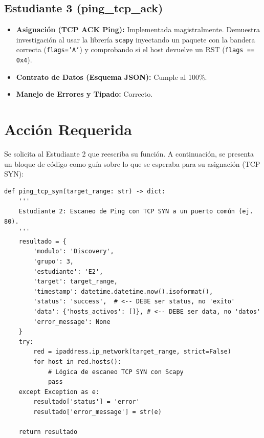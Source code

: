 \documentclass[12pt,a4paper]{article}
\begin{document}
\subsection*{\textcolor{green!70!black}{Estudiante 3 (ping\_tcp\_ack)}}
\begin{itemize}[label=$\bullet$]
    \item \textbf{Asignación (TCP ACK Ping):} Implementada magistralmente. Demuestra investigación al usar la librería \texttt{scapy} inyectando un paquete con la bandera correcta (\texttt{flags='A'}) y comprobando si el host devuelve un RST (\texttt{flags == 0x4}).
    \item \textbf{Contrato de Datos (Esquema JSON):} Cumple al 100\%.
    \item \textbf{Manejo de Errores y Tipado:} Correcto.
\end{itemize}

\section*{Acción Requerida}
Se solicita al Estudiante 2 que reescriba su función. A continuación, se presenta un bloque de código como guía sobre lo que se esperaba para su asignación (TCP SYN):

\begin{lstlisting}
def ping_tcp_syn(target_range: str) -> dict:
    '''
    Estudiante 2: Escaneo de Ping con TCP SYN a un puerto común (ej. 80).
    '''
    resultado = {
        'modulo': 'Discovery',
        'grupo': 3,
        'estudiante': 'E2',
        'target': target_range,
        'timestamp': datetime.datetime.now().isoformat(),
        'status': 'success',  # <-- DEBE ser status, no 'exito'
        'data': {'hosts_activos': []}, # <-- DEBE ser data, no 'datos'
        'error_message': None
    }
    try:
        red = ipaddress.ip_network(target_range, strict=False)
        for host in red.hosts():
            # Lógica de escaneo TCP SYN con Scapy
            pass
    except Exception as e:
        resultado['status'] = 'error'
        resultado['error_message'] = str(e)
        
    return resultado
\end{lstlisting}
\end{document}
